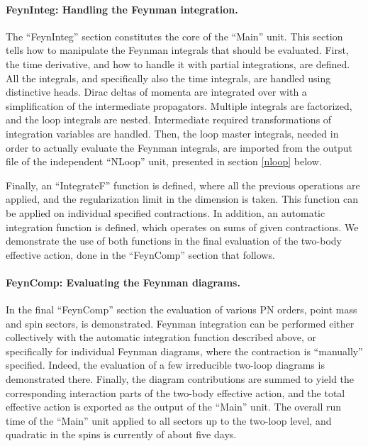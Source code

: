 \documentclass[a4paper,11pt]{article}
\begin{document}
\paragraph{FeynInteg: Handling the Feynman integration.}

The ``FeynInteg'' section constitutes the core of the ``Main'' unit. This section tells how 
to manipulate the Feynman integrals that should be evaluated. First, the time derivative, 
and how to handle it with partial integrations, are defined. All the integrals, and 
specifically also the time integrals, are handled using distinctive heads. Dirac deltas of 
momenta are integrated over with a simplification of the intermediate propagators. Multiple 
integrals are factorized, and the loop integrals are nested. Intermediate required 
transformations of integration variables are handled. Then, the loop master integrals, 
needed in order to actually evaluate the Feynman integrals, are imported from the output 
file of the independent ``NLoop'' unit, presented in section \ref{nloop} below. 

Finally, an ``IntegrateF'' function is defined, where all the previous operations are 
applied, and the regularization limit in the dimension is taken. This function can be 
applied on individual specified contractions. In addition, an automatic integration function 
is defined, which operates on sums of given contractions. We demonstrate the use of both 
functions in the final evaluation of the two-body effective action, done in the ``FeynComp'' 
section that follows.   

\paragraph{FeynComp: Evaluating the Feynman diagrams.}

In the final ``FeynComp'' section the evaluation of various PN orders, point mass and spin 
sectors, is demonstrated. Feynman integration can be performed either collectively with the 
automatic integration function described above, or specifically for individual Feynman 
diagrams, where the contraction is ``manually'' specified. Indeed, the evaluation of a few 
irreducible two-loop diagrams is demonstrated there. Finally, the diagram contributions are 
summed to yield the corresponding interaction parts of the two-body effective action, and
the total effective action is exported as the output of the ``Main'' unit. The overall run 
time of the ``Main'' unit applied to all sectors up to the two-loop level, and quadratic in 
the spins is currently of about five days.
\end{document}
